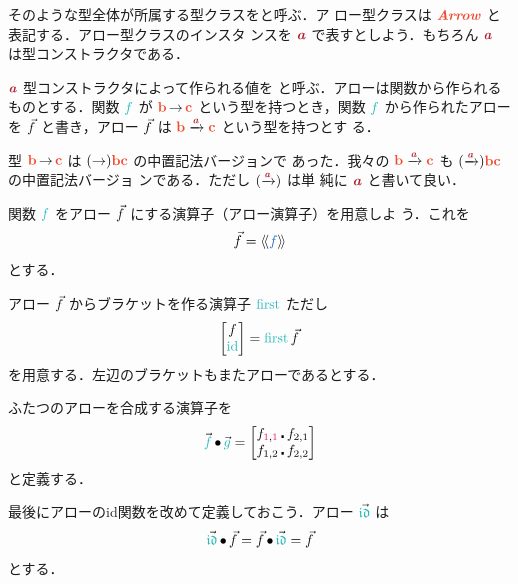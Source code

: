 \documentclass[a5paper,twoside,fleqn,draft]{jsbook}
\begin{document}
そのような型全体が所属する型クラスをと呼ぶ．ア
ロー型クラスは $\mArrowTypeClass$ と表記する．アロー型クラスのインスタ
ンスを $\mTypeConstructor{a}$ で表すとしよう．もちろん
$\mTypeConstructor{a}$ は型コンストラクタである．

$\mTypeConstructor{a}$ 型コンストラクタによって作られる値を
と呼ぶ．アローは関数から作られるものとする．関数 $\hFunc{f}$
が $\mB\mFuncArrow\mC$ という型を持つとき，関数 $\hFunc{f}$ から作られたアロー
を $\Vec{f}$ と書き，アロー $\Vec{f}$ は
$\mB\mArrowArrow{\mTypeConstructor{a}}\mC$ という型を持つとす
る．

型 $\mB\mFuncArrow\mC$ は $(\mFuncArrow)\mB\mC$ の中置記法バージョンで
あった．我々の $\mB\mArrowArrow{\mTypeConstructor{a}}\mC$ も
$(\mArrowArrow{\mTypeConstructor{a}})\mB\mC$ の中置記法バージョ
ンである．ただし $(\mArrowArrow{\mTypeConstructor{a}})$ は単
純に $\mTypeConstructor{a}$ と書いて良い．

\separator

関数 $\hFunc{f}$ をアロー $\Vec{f}$ にする演算子（アロー演算子）を用意しよ
う．これを
\begin{equation}
  \mArrow{f}
  =\mArrowWith{f}
\end{equation}
とする．

アロー $\Vec{f}$ からブラケットを作る演算子 $\mFirst$ ただし
\begin{equation}
  \begin{bmatrix}
    f\\
    \mId
  \end{bmatrix}
  =
  \mFirst\mArrow{f}
\end{equation}
を用意する．左辺のブラケットもまたアローであるとする．

ふたつのアローを合成する演算子を
\begin{equation}
  \mArrow{\hFunc{f}}\mCompCat\mArrow{\hFunc{g}}
  =
  \begin{bmatrix}
    f_{\hConstant{1},\hConstant{1}}\hCompose f_{2,1}\\
    f_{1,2}\hCompose f_{2,2}
  \end{bmatrix}
\end{equation}
と定義する．

最後にアローのid関数を改めて定義しておこう．アロー $\mArrow{\mIdCat}$
は
\begin{equation}
  \mArrow{\mIdCat}\mCompCat\mArrow{f}
  =\mArrow{f}\mCompCat\mArrow{\mIdCat}
  =\mArrow{f}
\end{equation}
とする．
\end{document}
